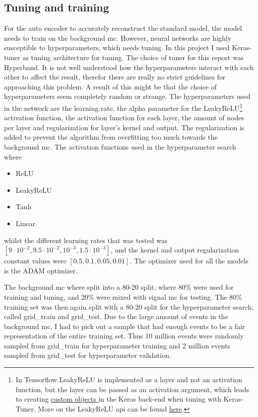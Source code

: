 \documentclass[ reprint, amsmath,amssymb, aps, nofootinbib]{revtex4-2}
\begin{document}
 

\subsection{Tuning and training}
For the auto encoder to accurately reconstruct the standard model, the model needs to train on the background mc. However, neural networks are highly susceptible to hyperparameters, which needs tuning. In this project I used Keras-tuner\cite{omalley2019kerastuner} as tuning architecture for tuning. The choice of tuner for this report was Hyperband\cite{JMLR:v18:16-558}. It is not well understood how the hyperparameters interact with each other to affect the result, therefor there are really no strict guidelines for approaching this problem. A result of this might be that the choice of hyperparameters seem completely random or strange. The hyperparameters used in the network are the learning rate, the alpha parameter for the LeakyReLU\footnote{In Tensorflow LeakyReLU is implemented as a layer and not an activation function, but the layer can be passed as an activation argument, which leads to creating \href{https://www.tensorflow.org/api_docs/python/tf/keras/utils/get_custom_objects}{custom objects } in the Keras back-end when tuning with Keras-Tuner. More on the LeakyReLU api can be found \href{https://www.tensorflow.org/api_docs/python/tf/keras/layers/LeakyReLU}{here}.} activation function, the activation function for each layer, the amount of nodes per layer and regularization for layer's kernel and output. The regularization is added to prevent the algorithm from overfitting too much towards the background mc. The activation functions used in the hyperparameter search where
\begin{itemize}
    \item ReLU
    \item LeakyReLU
    \item Tanh
    \item Linear
\end{itemize}
whilst the different learning rates that was tested was $[9\cdot 10^{-2}, 9.5\cdot 10^{-2}, 10^{-3}, 1.5\cdot 10^{-3}]$, and the kernel and output regularization constant values were $[0.5, 0.1, 0.05, 0.01]$. The optimizer used for all the models is the ADAM\cite{https://doi.org/10.48550/arxiv.1412.6980} optimizer. \par \par 
The background mc where split into a 80-20 split, where 80\% were used for training and tuning, and 20\% were mixed with signal mc for testing. The 80\% training set was then again split with a 80-20 split for the hyperparameter search, called grid\_train and grid\_test. Due to the large amount of events in the background mc, I had to pick out a sample that had enough events to be a fair representation of the entire training set. Thus 10 million events were randomly sampled from grid\_train for hyperparameter training and 2 million events sampled from grid\_test for hyperparameter validation. \par 
\end{document}
